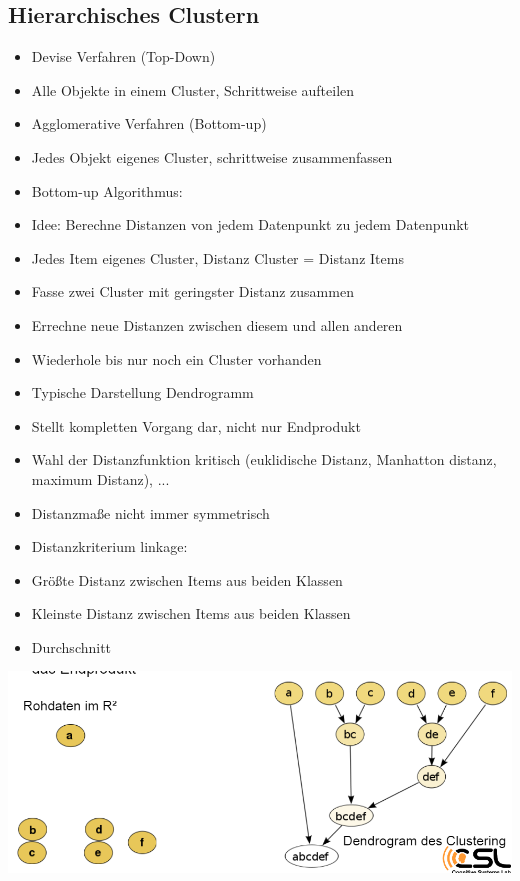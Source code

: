 \documentclass[a4paper,10pt,oneside]{article}
\begin{document}
\subsection{Hierarchisches Clustern}
\begin{itemize}
	\item Devise Verfahren (Top-Down)
	\item Alle Objekte in einem Cluster, Schrittweise aufteilen
	\item Agglomerative Verfahren (Bottom-up)
	\item Jedes Objekt eigenes Cluster, schrittweise zusammenfassen
	\item Bottom-up Algorithmus:
	\item Idee: Berechne Distanzen von jedem Datenpunkt zu jedem Datenpunkt
	\item Jedes Item eigenes Cluster, Distanz Cluster = Distanz Items
	\item Fasse zwei Cluster mit geringster Distanz zusammen
	\item Errechne neue Distanzen zwischen diesem und allen anderen
	\item Wiederhole bis nur noch ein Cluster vorhanden
	\item Typische Darstellung Dendrogramm
	\item Stellt kompletten Vorgang dar, nicht nur Endprodukt
	\item Wahl der Distanzfunktion kritisch (euklidische Distanz, Manhatton distanz, maximum Distanz), ...
	\item Distanzmaße nicht immer symmetrisch
	\item Distanzkriterium linkage:
	\item Größte Distanz zwischen Items aus beiden Klassen 
	\item Kleinste Distanz zwischen Items aus beiden Klassen
	\item Durchschnitt
\end{itemize}

\includegraphics[scale=0.65]{Grafiken/dendrogramm.png}
\end{document}
